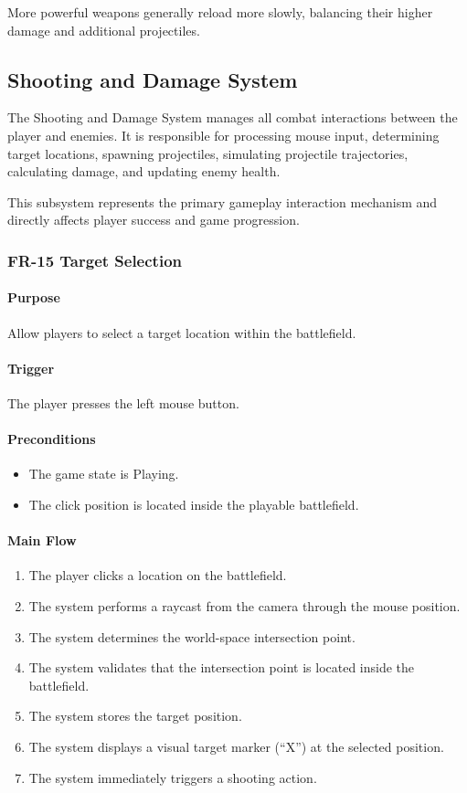 \documentclass[11pt,a4paper]{article}
\begin{document}
More powerful weapons generally reload more slowly, balancing their higher damage
and additional projectiles.

\subsection{Shooting and Damage System}

The Shooting and Damage System manages all combat interactions between the player
and enemies. It is responsible for processing mouse input, determining target
locations, spawning projectiles, simulating projectile trajectories, calculating
damage, and updating enemy health.

This subsystem represents the primary gameplay interaction mechanism and directly
affects player success and game progression.

\subsubsection{FR-15 Target Selection}

\paragraph{Purpose}
Allow players to select a target location within the battlefield.

\paragraph{Trigger}
The player presses the left mouse button.

\paragraph{Preconditions}
\begin{itemize}
  \item The game state is Playing.
  \item The click position is located inside the playable battlefield.
\end{itemize}

\paragraph{Main Flow}
\begin{enumerate}
  \item The player clicks a location on the battlefield.
  \item The system performs a raycast from the camera through the mouse position.
  \item The system determines the world-space intersection point.
  \item The system validates that the intersection point is located inside the
        battlefield.
  \item The system stores the target position.
  \item The system displays a visual target marker (``X'') at the selected
        position.
  \item The system immediately triggers a shooting action.
\end{enumerate}
\end{document}
